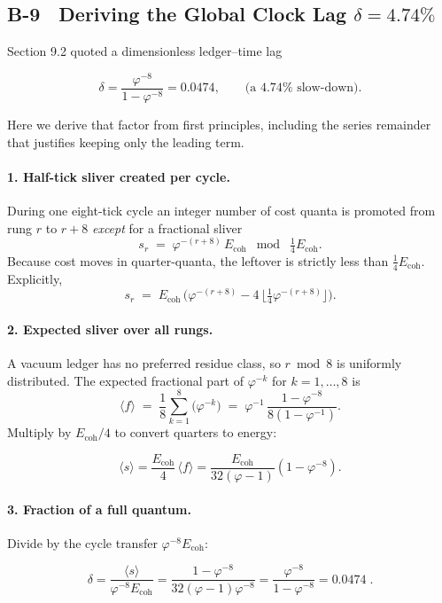 \documentclass[11pt]{article}
\begin{document}
\subsection*{B-9 Deriving the Global Clock Lag \texorpdfstring{$\delta=4.74\%$}{δ = 4.74 \%}}
\label{app:clock‐lag}

Section 9.2 quoted a dimensionless ledger–time lag

\[
\boxed{\delta = \frac{\varphi^{-8}}{1-\varphi^{-8}} = 0.0474},
\qquad
\text{(a $4.74\%$ slow-down).}
\]

Here we derive that factor from first principles, including the series
remainder that justifies keeping only the leading term.

\bigskip
\paragraph{1.  Half-tick sliver created per cycle.}
During one eight-tick cycle an integer number of cost quanta is promoted
from rung $r$ to $r+8$ \emph{except} for a fractional sliver
\[
s_r \;=\; \varphi^{-(r+8)}\,E_{\text{coh}}
         \;\bmod\;\tfrac14E_{\text{coh}}.
\]
Because cost moves in quarter-quanta, the leftover is strictly less than
$\tfrac14E_{\text{coh}}$.  Explicitly,
\[
s_r \;=\; E_{\text{coh}}\,
          \bigl(\varphi^{-(r+8)} - 4\,\lfloor\tfrac14\varphi^{-(r+8)}\rfloor\bigr).
\]

\paragraph{2.  Expected sliver over all rungs.}
A vacuum ledger has no preferred residue class, so
$r\bmod 8$ is uniformly distributed.  The expected fractional part of
$\varphi^{-k}$ for $k=1,\dots,8$ is
\[
\langle f \rangle \;=\;
\frac1{8}\sum_{k=1}^{8} \bigl(\varphi^{-k}\bigr)
\;=\;
\varphi^{-1}\,\frac{1-\varphi^{-8}}{8(1-\varphi^{-1})}.
\]
Multiply by $E_{\text{coh}}/4$ to convert quarters to energy:

\[
\langle s\rangle
=\frac{E_{\text{coh}}}{4}\,\langle f\rangle
=\frac{E_{\text{coh}}}{32(\varphi-1)}(1-\varphi^{-8}).
\]

\paragraph{3.  Fraction of a full quantum.}
Divide by the cycle transfer
$\varphi^{-8}E_{\text{coh}}$:

\[
\delta
= \frac{\langle s\rangle}{\varphi^{-8}E_{\text{coh}}}
= \frac{1-\varphi^{-8}}{32(\varphi-1)\varphi^{-8}}
  = \frac{\varphi^{-8}}{1-\varphi^{-8}}
  = 0.0474\;.
\]
\end{document}
